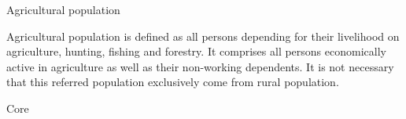 \documentclass[print,Draft]{faosyb}
\begin{document}

\begin{metadata}{Agricultural population}

Agricultural population is defined as all persons depending for their livelihood on agriculture, hunting, fishing and forestry. It comprises all persons economically active in agriculture as well as their non-working dependents. It is not necessary that this referred population exclusively come from rural population.
\end{metadata}


\begin{metadata}{Core}
  \lipsum[1]
\end{metadata}
\end{document}
